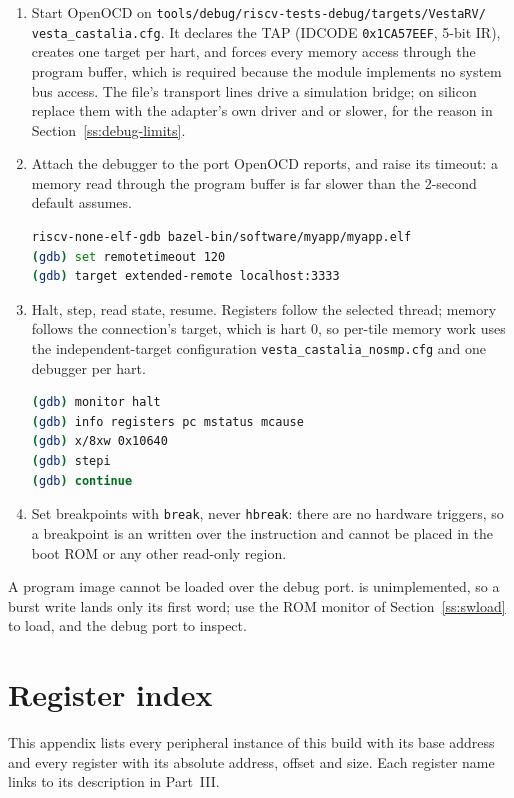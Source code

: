 \documentclass[11pt,pdftex,openany,letterpaper]{report}
\begin{document}
\begin{enumerate}[itemsep=1pt]
	\item Start OpenOCD on \texttt{tools/debug/riscv-tests-debug/targets/VestaRV/} \texttt{vesta\_castalia.cfg}. It declares the TAP (IDCODE \texttt{0x1CA57EEF}, 5-bit IR), creates one target per hart, and forces every memory access through the program buffer, which is required because the module implements no system bus access. The file's transport lines drive a simulation bridge; on silicon replace them with the adapter's own driver and  or slower, for the reason in Section~\ref{ss:debug-limits}.
	\item Attach the debugger to the port OpenOCD reports, and raise its timeout: a memory read through the program buffer is far slower than the 2-second default assumes.
\begin{lstlisting}[language=bash]
riscv-none-elf-gdb bazel-bin/software/myapp/myapp.elf
(gdb) set remotetimeout 120
(gdb) target extended-remote localhost:3333
\end{lstlisting}
	\item Halt, step, read state, resume. Registers follow the selected thread; memory follows the connection's target, which is hart 0, so per-tile memory work uses the independent-target configuration \texttt{vesta\_castalia\_nosmp.cfg} and one debugger per hart.
\begin{lstlisting}[language=bash]
(gdb) monitor halt
(gdb) info registers pc mstatus mcause
(gdb) x/8xw 0x10640
(gdb) stepi
(gdb) continue
\end{lstlisting}
	\item Set breakpoints with \texttt{break}, never \texttt{hbreak}: there are no hardware triggers, so a breakpoint is an  written over the instruction and cannot be placed in the boot ROM or any other read-only region.
\end{enumerate}

\noindent A program image cannot be loaded over the debug port.  is unimplemented, so a burst write lands only its first word; use the ROM monitor of Section~\ref{ss:swload} to load, and the debug port to inspect.

\clearpage



\chapter{Register index} \label{s:regMemMap}
This appendix lists every peripheral instance of this build with its base address and every register with its absolute address, offset and size. Each register name links to its description in Part~III.
\end{document}
